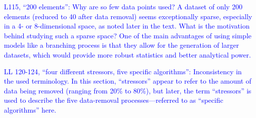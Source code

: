 \documentclass[
]{article}
\begin{document}
\textcolor{blue}{L115, ``200 elements'': Why are so few data points used? A dataset of only 200 elements (reduced to 40 after data removal) seems exceptionally sparse, especially in a 4- or 8-dimensional space, as noted later in the text.
What is the motivation behind studying such a sparse space? One of the main advantages of using simple models like a branching process is that they allow for the generation of larger datasets, which would provide more robust statistics and better analytical power.}


\textcolor{blue}{LL 120-124, ``four different stressors, five specific algorithms'': Inconsistency in the used terminology.
In this section, ``stressors'' appear to refer to the amount of data being removed (ranging from 20\% to 80\%), but later, the term ``stressors'' is used to describe the five data-removal processes---referred to as ``specific algorithms'' here.}
\end{document}
